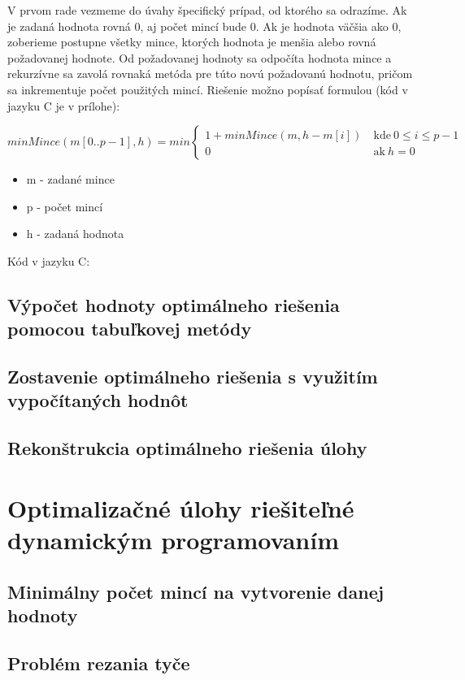 V prvom rade vezmeme do úvahy špecifický prípad, od ktorého sa odrazíme. Ak je zadaná hodnota rovná 0, aj počet mincí bude 0. Ak je hodnota väčšia ako 0, zoberieme postupne všetky mince, ktorých hodnota je menšia alebo rovná požadovanej hodnote. Od požadovanej hodnoty sa odpočíta hodnota mince a rekurzívne sa zavolá rovnaká metóda pre túto novú požadovanú hodnotu, pričom sa inkrementuje počet použitých mincí. Riešenie možno popísať formulou (kód v jazyku C je v prílohe):

$$
minMince(m[0..p - 1], h) = min
\left\{
\begin{array}{ll}
1 + minMince(m, h - m[i]) &\ \text{kde}\ 0 \leq i \leq p - 1\\
0 &\ \text{ak}\ h=0
\end{array}
\right.
$$

\begin{itemize}
    \item m - zadané mince
    \item p - počet mincí
    \item h - zadaná hodnota
\end{itemize}

Kód v jazyku C:



\subsection{Výpočet hodnoty optimálneho riešenia pomocou tabuľkovej metódy} \label{vypocetHodnoty}
\subsection{Zostavenie optimálneho riešenia s využitím vypočítaných hodnôt} \label{zostavRies}

\subsection{Rekonštrukcia optimálneho riešenia úlohy}

\section{Optimalizačné úlohy riešiteľné dynamickým programovaním}
\subsection{Minimálny počet mincí na vytvorenie danej hodnoty}
\subsection{Problém rezania tyče}
